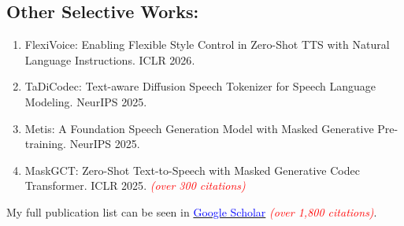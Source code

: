 \documentclass{resume}
\begin{document}
\subsection{\textbf{Other Selective Works:}}
\begin{enumerate}\itemsep 0.35em
  \item FlexiVoice: Enabling Flexible Style Control in Zero-Shot TTS with Natural Language Instructions. {ICLR 2026}.
  \item TaDiCodec: Text-aware Diffusion Speech Tokenizer for Speech Language Modeling. {NeurIPS 2025}.
  \item Metis: A Foundation Speech Generation Model with Masked Generative Pre-training. {NeurIPS 2025}.
  \item MaskGCT: Zero-Shot Text-to-Speech with Masked Generative Codec Transformer. {ICLR 2025}. \textcolor{red}{\textit{(over 300 citations)}}
\end{enumerate}

My full publication list can be seen in \href{https://scholar.google.com/citations?user=lf1udBcAAAAJ&hl=en}{\textcolor{blue}{Google Scholar}} \textcolor{red}{\textit{(over 1,800 citations)}}.
\end{document}
